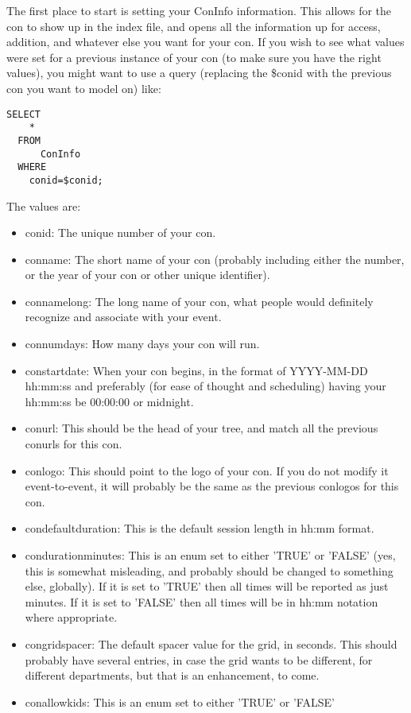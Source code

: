 \documentclass[captions=tablesignature]{scrartcl}
\begin{document}
The first place to start is setting your ConInfo information.  This
allows for the con to show up in the index file, and opens all the
information up for access, addition, and whatever else you want for
your con.  If you wish to see what values were set for a previous
instance of your con (to make sure you have the right values), you
might want to use a query (replacing the \$conid with the previous
con you want to model on) like:
\begin{verbatim}
SELECT
    *
  FROM
      ConInfo
  WHERE
    conid=$conid;
\end{verbatim}
The values are:
\begin{itemize}
\item conid: The unique number of your con.
\item conname: The short name of your con (probably including either
the number, or the year of your con or other unique identifier).
\item connamelong: The long name of your con, what people would
definitely recognize and associate with your event.
\item connumdays: How many days your con will run.
\item constartdate: When your con begins, in the format of YYYY-MM-DD
hh:mm:ss and preferably (for ease of thought and scheduling)
having your hh:mm:ss be 00:00:00 or midnight.
\item conurl: This should be the head of your tree, and match all the
previous conurls for this con.
\item conlogo: This should point to the logo of your con.  If you do
not modify it event-to-event, it will probably be the same as the
previous conlogos for this con.
\item condefaultduration: This is the default session length in hh:mm
format.
\item condurationminutes: This is an enum set to either 'TRUE' or
'FALSE' (yes, this is somewhat misleading, and probably should be
changed to something else, globally).  If it is set to 'TRUE'
then all times will be reported as just minutes.  If it is set to
'FALSE' then all times will be in hh:mm notation where
appropriate.
\item congridspacer: The default spacer value for the grid, in seconds.
This should probably have several entries, in case the grid wants
to be different, for different departments, but that is an
enhancement, to come.
\item conallowkids: This is an enum set to either 'TRUE' or 'FALSE'

\end{itemize}
\end{document}
